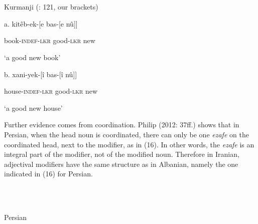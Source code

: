 \documentclass[output=paper]{langsci/langscibook}
\begin{document}
\begin{styleSfondomedioiColorexxi}
\ea%
    \label{ex:key:15}
    \gll\\
        \\
    \glt
    \z

          Kurmanji (\citealt{Yamakido2005}: 121, our brackets)
\end{styleSfondomedioiColorexxi}

\begin{styleSfondomedioiColorexxi}
a.  kitêb-ek-[e    bas-[e    nû]]
\end{styleSfondomedioiColorexxi}

\begin{styleSfondomedioiColorexxi}
    book-\textsc{indef-lkr}   good-\textsc{lkr}   new
\end{styleSfondomedioiColorexxi}

\begin{styleSfondomedioiColorexxi}
    ‘a good new book’
\end{styleSfondomedioiColorexxi}

\begin{styleSfondomedioiColorexxi}
b.  xani-yek-[î    bas-[î    nû]]
\end{styleSfondomedioiColorexxi}

\begin{styleSfondomedioiColorexxi}
    house-\textsc{indef-lkr}   good-\textsc{lkr}   new
\end{styleSfondomedioiColorexxi}

\begin{styleSfondomedioiColorexxi}
    ‘a good new house’         
\end{styleSfondomedioiColorexxi}

\begin{styleSfondomedioiColorexxi}
Further evidence comes from coordination. Philip (2012: 37ff.) shows that in Persian, when the head noun is coordinated, there can only be one \textit{ezafe} on the coordinated head, next to the modifier, as in (16). In other words, the \textit{ezafe} is an integral part of the modifier, not of the modified noun. Therefore in Iranian, adjectival modifiers have the same structure as in Albanian, namely the one indicated in (16) for Persian.
\end{styleSfondomedioiColorexxi}

\begin{styleSfondomedioiColorexxi}
\ea%
    \label{ex:key:16}
    \gll\\
        \\
    \glt
    \z

           Persian \citep[38]{Philip2012}
\end{styleSfondomedioiColorexxi}
\end{document}
